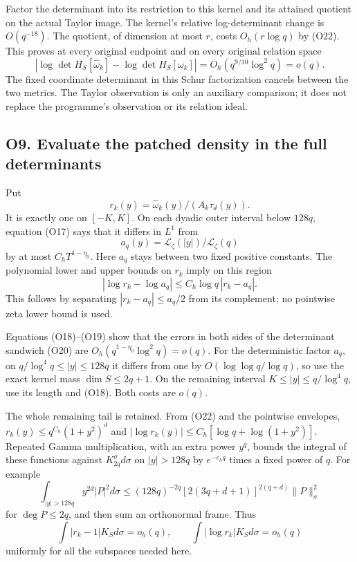 \documentclass[
  11pt,
]{article}
\begin{document}
Factor the determinant into its restriction to this kernel and its
attained quotient on the actual Taylor image. The kernel's relative
log-determinant change is \(O(q^{-18})\). The quotient, of dimension at
most \(r\), costs \(O_h(r\log q)\) by (O22). This proves at every
original endpoint and on every original relation space \[
|\log\det H_S[\widehat\omega_k]-\log\det H_S[\omega_k]|
=O_h(q^{9/10}\log^2q)=o(q).\tag{O24}
\] The fixed coordinate determinant in this Schur factorization cancels
between the two metrics. The Taylor observation is only an auxiliary
comparison; it does not replace the programme's observation or its
relation ideal.

\subsection{O9. Evaluate the patched density in the full
determinants}\label{o9.-evaluate-the-patched-density-in-the-full-determinants}

Put \[
r_k(y)=\widehat\omega_k(y)/(A_k\tau_d(y)).
\] It is exactly one on \([-K,K]\). On each dyadic outer interval below
\(128q\), equation (O17) says that it differs in \(L^1\) from \[
a_q(y)=\mathcal L_\zeta(|y|)/\mathcal L_\zeta(q)
\] by at most \(C_hT^{1-\eta_0}\). Here \(a_q\) stays between two fixed
positive constants. The polynomial lower and upper bounds on \(r_k\)
imply on this region \[
|\log r_k-\log a_q|\le C_h\log q\,|r_k-a_q|.\tag{O25}
\] This follows by separating \(|r_k-a_q|\le a_q/2\) from its
complement; no pointwise zeta lower bound is used.

Equations (O18)--(O19) show that the errors in both sides of the
determinant sandwich (O20) are \(O_h(q^{1-\eta_0}\log^2q)=o(q)\). For
the deterministic factor \(a_q\), on \(q/\log^4q\le|y|\le128q\) it
differs from one by \(O(\log\log q/\log q)\), so use the exact kernel
mass \(\dim S\le2q+1\). On the remaining interval
\(K\le|y|\le q/\log^4q\), use its length and (O18). Both costs are
\(o(q)\).

The whole remaining tail is retained. From (O22) and the pointwise
envelopes, \(r_k(y)\le q^{C_h}(1+y^2)^d\) and
\(|\log r_k(y)|\le C_h[\log q+\log(1+y^2)]\). Repeated Gamma
multiplication, with an extra power \(y^q\), bounds the integral of
these functions against \(K_{2q}^\sigma d\sigma\) on \(|y|>128q\) by
\(e^{-c_hq}\) times a fixed power of \(q\). For example \[
\int_{|y|>128q}y^{2d}|P|^2d\sigma
\le(128q)^{-2q}[2(3q+d+1)]^{2(q+d)}\|P\|_\sigma^2
\] for \(\deg P\le2q\), and then sum an orthonormal frame. Thus \[
\boxed{\int|r_k-1|K_Sd\sigma=o_h(q),\qquad
\int|\log r_k|K_Sd\sigma=o_h(q)}\tag{O26}
\] uniformly for all the subspaces needed here.
\end{document}
